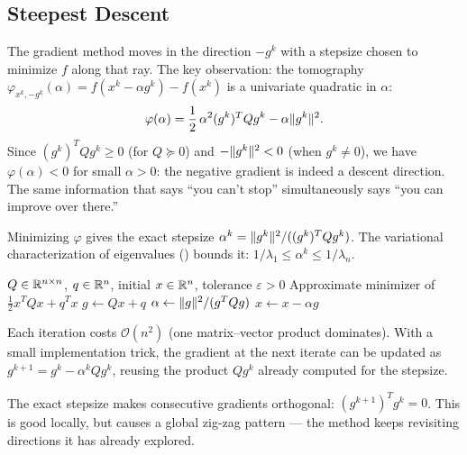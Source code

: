 \subsection{Steepest Descent}\label{ssec:steepest-descent}

The gradient method moves in the direction $-g^k$ with a stepsize chosen to minimize $f$ along that ray.
The key observation: the tomography $\varphi_{x^k, -g^k}(\alpha) = f(x^k - \alpha g^k) - f(x^k)$ is a univariate quadratic in $\alpha$:
\begin{equation}\label{eq:sd-tomography}
	\varphi(\alpha) = \frac{1}{2}\, \alpha^2 (g^k)^T Q g^k - \alpha \lVert g^k\rVert^2.
\end{equation}
Since $(g^k)^T Q g^k \geq 0$ (for $Q \succeq 0$) and $-\lVert g^k\rVert^2 < 0$ (when $g^k \neq 0$), we have $\varphi(\alpha) < 0$ for small $\alpha > 0$: the negative gradient is indeed a descent direction.
The same information that says ``you can't stop'' simultaneously says ``you can improve over there.''

Minimizing $\varphi$ gives the exact stepsize $\alpha^k = \lVert g^k\rVert^2 / ((g^k)^T Q g^k)$.
The variational characterization of eigenvalues () bounds it: $1/\lambda_1 \leq \alpha^k \leq 1/\lambda_n$.

\begin{algorithm}
	\caption{Steepest Descent for Quadratic Functions (SDQ)}
	\label{alg:SDQ}
	\begin{algorithmic}[1]
		\Require $Q \in \mathbb{R}^{n \times n}$, $q \in \mathbb{R}^n$, initial $x \in \mathbb{R}^n$, tolerance $\varepsilon > 0$
		\Ensure Approximate minimizer of $\frac{1}{2} x^T Q x + q^T x$
				\State $g \gets Qx + q$
				\State $\alpha \gets \lVert g\rVert^2 / (g^T Q g)$ 
				\State $x \gets x - \alpha g$
			\EndWhile
		\EndProcedure
	\end{algorithmic}
\end{algorithm}

Each iteration costs $\mathcal{O}(n^2)$ (one matrix--vector product dominates).
With a small implementation trick, the gradient at the next iterate can be updated as $g^{k+1} = g^k - \alpha^k Q g^k$, reusing the product $Q g^k$ already computed for the stepsize.

The exact stepsize makes consecutive gradients orthogonal: $(g^{k+1})^T g^k = 0$.
This is good locally, but causes a global zig-zag pattern --- the method keeps revisiting directions it has already explored.


